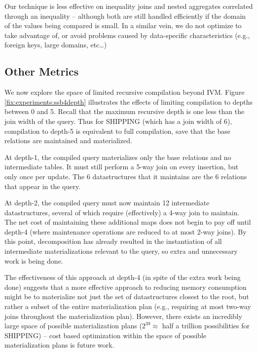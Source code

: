 Our technique is less effective on inequality joins and nested aggregates correlated through an inequality -- although both are still handled efficiently if the domain of the values being compared is small.  In a similar vein, we do not optimize to take advantage of, or avoid problems caused by data-specific characteristics (e.g., foreign keys, large domains, etc\ldots)

\subsection{Other Metrics}
\label{sec:experiments:othermetrics}

We now explore the space of limited recursive compilation beyond IVM.  Figure \ref{fix:experiments:ssb4depth} illustrates the effects of limiting compilation to depths between 0 and 5.  Recall that the maximum recursive depth is one less than the join width of the query.  Thus for SHIPPING (which has a join width of 6), compilation to depth-5 is equivalent to full compilation, save that the base relations are maintained and materialized.

At depth-1, the compiled query materializes only the base relations and no intermediate tables.  It must still perform a 5-way join on every insertion, but  only once per update.  The 6 datastructures that it maintains are the 6 relations that appear in the query.  

At depth-2, the compiled query must now maintain 12 intermediate datastructures, several of which require (effectively) a 4-way join to maintain.  The net cost of maintaining these additional maps does not begin to pay off until depth-4 (where maintenance operations are reduced to at most 2-way joins).  By this point, decomposition has already resulted in the instantiation of all intermediate materializations relevant to the query, so extra and unnecessary work is being done.  

The effectiveness of this approach at depth-4 (in spite of the extra work being done) suggests that a more effective approach to reducing memory consumption might be to materialize not just the set of datastructures closest to the root, but rather a subset of the entire materialization plan (e.g., requiring at most two-way joins throughout the materialization plan).  However, there exists an incredibly large space of possible materialization plans ($2^{39} \approx $ half a trillion possibilities for SHIPPING) -- cost based optimization within the space of possible materialization plans is future work.


\begin{figure}
\begin{center}
\end{center}
\end{figure}




